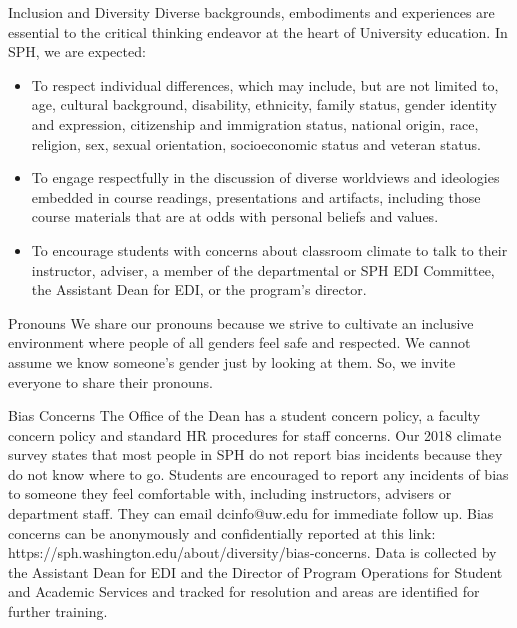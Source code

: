 \documentclass[10pt,t]{beamer}
\begin{document}
\begin{frame}{Inclusion and Diversity}
Diverse backgrounds, embodiments and experiences are essential to the critical thinking endeavor at the heart of University education. In SPH, we are expected:
\begin{itemize}
	\item To respect individual differences, which may include, but are not limited to, age, cultural background, disability, ethnicity, family status, gender identity and expression, citizenship and immigration status, national origin, race, religion, sex, sexual orientation, socioeconomic status and veteran status.
	\item To engage respectfully in the discussion of diverse worldviews and ideologies embedded in course readings, presentations and artifacts, including those course materials that are at odds with personal beliefs and values. 
	\item To encourage students with concerns about classroom climate to talk to their instructor, adviser, a member of the departmental or SPH EDI Committee, the Assistant Dean for EDI, or the program’s director.
\end{itemize}
\end{frame}

\begin{frame}{Pronouns}
We share our pronouns because we strive to cultivate an inclusive environment where people of all genders feel safe and respected. We cannot assume we know someone’s gender just by looking at them. So, we invite everyone to share their pronouns.
\end{frame}

\begin{frame}{Bias Concerns}
The Office of the Dean has a student concern policy, a faculty concern policy and standard HR procedures for staff concerns. Our 2018 climate survey states that most people in SPH do not report bias incidents because they do not know where to go. Students are encouraged to report any incidents of bias to someone they feel comfortable with, including instructors, advisers or department staff. They can email dcinfo@uw.edu for immediate follow up. Bias concerns can be anonymously and confidentially reported at this link: https://sph.washington.edu/about/diversity/bias-concerns. Data is collected by the Assistant Dean for EDI and the Director of Program Operations for Student and Academic Services and tracked for resolution and areas are identified for further training.
\end{frame}
\end{document}
